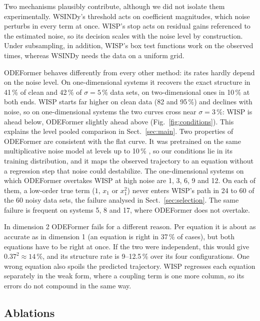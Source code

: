 \documentclass[10pt]{article}
\newcommand{\pv}[1]{\textcolor{prelim}{#1}}
\newcommand{\pv}[1]{#1}
\begin{document}
Two mechanisms plausibly contribute, although we did not isolate them experimentally. WSINDy's threshold acts on
coefficient magnitudes, which noise perturbs in every term at once. WISP's stop acts on residual gains referenced to
the estimated noise, so its decision scales with the noise level by construction. Under subsampling, in addition,
WISP's box test functions work on the observed times, whereas WSINDy needs the data on a uniform grid.

ODEFormer behaves differently from every other method: its rates hardly depend on the noise level. On
one-dimensional systems it recovers the exact structure in \pv{41}\,\% of clean and \pv{42}\,\% of $\sigma=5\,\%$ data
sets, on two-dimensional ones in \pv{10}\,\% at both ends. WISP starts far higher on clean data (\pv{82} and
\pv{95}\,\%) and declines with noise, so on one-dimensional systems the two curves cross near $\sigma=3\,\%$: WISP is
ahead below, ODEFormer slightly ahead above (Fig.~\ref{fig:conditions}). This explains the level pooled comparison in
Sect.~\ref{sec:main}. Two properties of ODEFormer are consistent with the flat curve. It was pretrained on the same
multiplicative noise model at levels up to 10\,\% \cite{dascoli2023arxiv}, so our conditions lie in its training distribution, and it maps the
observed trajectory to an equation without a regression step that noise could destabilize. The one-dimensional systems
on which ODEFormer overtakes WISP at high noise are 1, 3, 6, 9 and 12. On each of them, a low-order true term ($1$,
$x_1$ or $x_1^2$) never enters WISP's path in \pv{24 to 60} of the 60 noisy data sets, the failure analysed in
Sect.~\ref{sec:selection}. The same failure is frequent on systems 5, 8 and 17, where ODEFormer does not overtake.

In dimension 2 ODEFormer fails for a different reason. Per equation it is about as accurate as in dimension 1 (an
equation is right in \pv{37}\,\% of cases), but both equations have to be right at once. If the two were independent,
this would give \pv{$0.37^2\approx14\,\%$}, and its structure rate is \pv{9--12.5}\,\% over its four configurations.
One wrong equation also spoils the predicted trajectory. WISP regresses each equation separately in the weak form,
where a coupling term is one more column, so its errors do not compound in the same way.

\subsection{Ablations}\label{sec:ablation}
\end{document}
